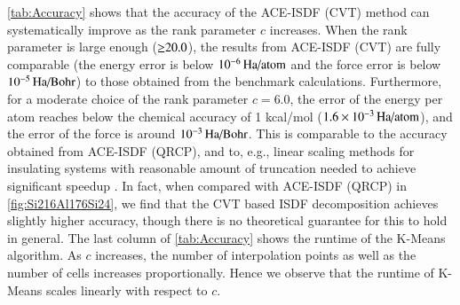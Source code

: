 \cref{tab:Accuracy} shows that the accuracy of the ACE\hyp{}ISDF (CVT) method
can systematically improve as the rank parameter $c$ increases. When the rank
parameter is large enough ($\mathbin{\Geq}20.0$), the results from ACE\hyp{}ISDF
(CVT) are fully comparable (the energy error is below $10^{-6}\HaPA$ and the
force error is below $10^{-5}\HaPB$) to those obtained from the benchmark
calculations. Furthermore, for a moderate choice of the rank parameter $c=6.0$,
the error of the energy per atom reaches below the chemical accuracy of 1
kcal/mol ($1.6\times 10^{-3}\HaPA$), and the error of the force is around $10^
{-3}\HaPB$. This is comparable to the accuracy obtained from ACE\hyp{}ISDF 
(QRCP), and to, e.g., linear scaling methods for insulating systems with
reasonable amount of truncation needed to achieve significant speedup 
\cite{JCTC_11_4655_2015}. In fact, when compared with ACE\hyp{}ISDF (QRCP) in 
\cref{fig:Si216Al176Si24}, we find that the CVT based ISDF decomposition
achieves slightly higher accuracy, though there is no theoretical guarantee for
this to hold in general. The last column of \cref{tab:Accuracy} shows the
runtime of the K\hyp{}Means algorithm. As $c$ increases, the number of
interpolation points as well as the number of cells increases proportionally.
Hence we observe that the runtime of K\hyp{}Means scales linearly with respect
to $c$.

